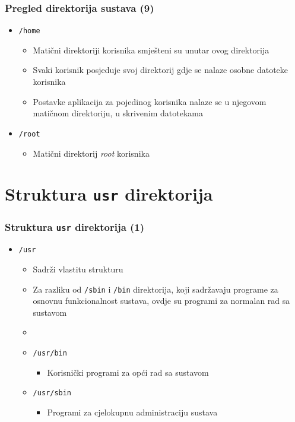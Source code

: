 \documentclass{beamer}
\begin{document}
\begin{frame}[t]
\frametitle{Pregled direktorija sustava (9)}
\begin{itemize}
  \item \texttt{/home}
  \begin{itemize}
    \item Matični direktoriji korisnika smješteni su unutar ovog
          direktorija
    \item Svaki korisnik posjeduje svoj direktorij gdje se nalaze osobne
          datoteke korisnika
    \item Postavke aplikacija za pojedinog korisnika nalaze se u njegovom
          matičnom direktoriju, u skrivenim datotekama
  \end{itemize}
  \item \texttt{/root}
  \begin{itemize}
    \item Matični direktorij \emph{root} korisnika
  \end{itemize}
\end{itemize}
\end{frame}

\section{Struktura \texttt{usr} direktorija}
\begin{frame}[t]
\frametitle{Struktura \texttt{usr} direktorija (1)}
\begin{itemize}
  \item \texttt{/usr}
  \begin{itemize}
    \item Sadrži vlastitu strukturu
    \item Za razliku od \texttt{/sbin} i \texttt{/bin} direktorija, koji
          sadržavaju programe za osnovnu funkcionalnost sustava, ovdje su
          programi za normalan rad sa sustavom
    \item[]
    \item[] \texttt{/usr/bin}
    \begin{itemize}
      \item Korisnički programi za opći rad sa sustavom
    \end{itemize}
    \item[] \texttt{/usr/sbin}
    \begin{itemize}
      \item Programi za cjelokupnu administraciju sustava
    \end{itemize}
  \end{itemize}
\end{itemize}
\end{frame}
\end{document}
